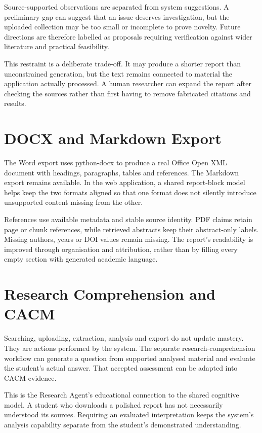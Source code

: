 Source-supported observations are separated from system suggestions. A preliminary gap can suggest that an issue deserves investigation, but the uploaded collection may be too small or incomplete to prove novelty. Future directions are therefore labelled as proposals requiring verification against wider literature and practical feasibility.

This restraint is a deliberate trade-off. It may produce a shorter report than unconstrained generation, but the text remains connected to material the application actually processed. A human researcher can expand the report after checking the sources rather than first having to remove fabricated citations and results.

\section{DOCX and Markdown Export}
The Word export uses python-docx to produce a real Office Open XML document with headings, paragraphs, tables and references. The Markdown export remains available. In the web application, a shared report-block model helps keep the two formats aligned so that one format does not silently introduce unsupported content missing from the other.

References use available metadata and stable source identity. PDF claims retain page or chunk references, while retrieved abstracts keep their abstract-only labels. Missing authors, years or DOI values remain missing. The report's readability is improved through organisation and attribution, rather than by filling every empty section with generated academic language.

\section{Research Comprehension and CACM}
Searching, uploading, extraction, analysis and export do not update mastery. They are actions performed by the system. The separate research-comprehension workflow can generate a question from supported analysed material and evaluate the student's actual answer. That accepted assessment can be adapted into CACM evidence.

This is the Research Agent's educational connection to the shared cognitive model. A student who downloads a polished report has not necessarily understood its sources. Requiring an evaluated interpretation keeps the system's analysis capability separate from the student's demonstrated understanding.

